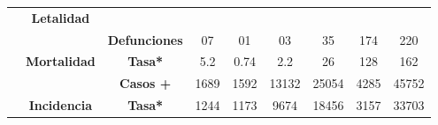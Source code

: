 \begin{tabular}{ccc|cccccc|}
		&\multicolumn{1}{c|}{\multirow{-2}{*}{\cellcolor[HTML]{E2EFDA}\textbf{Letalidad}}}&\cellcolor[HTML]{E2EFDA} 
		&\multicolumn{1}{c|}{\cellcolor[HTML]{E2EFDA}} 
		&\multicolumn{1}{c|}{\cellcolor[HTML]{E2EFDA}} 
		&\multicolumn{1}{c|}{\cellcolor[HTML]{E2EFDA}} 
		&\multicolumn{1}{c|}{\cellcolor[HTML]{E2EFDA}} 
		&\multicolumn{1}{c|}{\cellcolor[HTML]{E2EFDA}} 
		&\cellcolor[HTML]{E2EFDA} \\ \cline{2-2}
		\rowcolor[HTML]{E2EFDA} 
		\multicolumn{1}{|c|}{\cellcolor[HTML]{E2EFDA}} 
		&\multicolumn{1}{c|}{\cellcolor[HTML]{E2EFDA}} 
		&\multirow{-2}{*}{\cellcolor[HTML]{E2EFDA}\textbf{Defunciones}} 
		&\multicolumn{1}{c|}{\multirow{-2}{*}{\cellcolor[HTML]{E2EFDA}07}} 
		&\multicolumn{1}{c|}{\multirow{-2}{*}{\cellcolor[HTML]{E2EFDA}01}} 
		&\multicolumn{1}{c|}{\multirow{-2}{*}{\cellcolor[HTML]{E2EFDA}03}} 
		&\multicolumn{1}{c|}{\multirow{-2}{*}{\cellcolor[HTML]{E2EFDA}35}} 
		&\multicolumn{1}{c|}{\multirow{-2}{*}{\cellcolor[HTML]{E2EFDA}174}} 
		&\multirow{-2}{*}{\cellcolor[HTML]{E2EFDA}220} \\ \cline{3-9} 
		\rowcolor[HTML]{E2EFDA} 
		\multicolumn{1}{|c|}{\cellcolor[HTML]{E2EFDA}} &
		\multicolumn{1}{c|}{\multirow{-2}{*}{\cellcolor[HTML]{E2EFDA}\textbf{Mortalidad}}}&\textbf{Tasa*} 
		&\multicolumn{1}{c|}{\cellcolor[HTML]{E2EFDA}5.2} 
		&\multicolumn{1}{c|}{\cellcolor[HTML]{E2EFDA}0.74} 
		&\multicolumn{1}{c|}{\cellcolor[HTML]{E2EFDA}2.2} 
		&\multicolumn{1}{c|}{\cellcolor[HTML]{E2EFDA}26} 
		&\multicolumn{1}{c|}{\cellcolor[HTML]{E2EFDA}128} 
		&162 \\ \cline{2-9} 
		\rowcolor[HTML]{E2EFDA} 
		\multicolumn{1}{|c|}{\cellcolor[HTML]{E2EFDA}} &
		\multicolumn{1}{c|}{\cellcolor[HTML]{E2EFDA}} &
		\textbf{Casos +} &
		\multicolumn{1}{c|}{\cellcolor[HTML]{E2EFDA}1689} &
		\multicolumn{1}{c|}{\cellcolor[HTML]{E2EFDA}1592} &
		\multicolumn{1}{c|}{\cellcolor[HTML]{E2EFDA}13132} &
		\multicolumn{1}{c|}{\cellcolor[HTML]{E2EFDA}25054} &
		\multicolumn{1}{c|}{\cellcolor[HTML]{E2EFDA}4285} &
		45752 \\ \cline{3-9} 
		\rowcolor[HTML]{E2EFDA} 
		\multicolumn{1}{|c|}{\multirow{-6}{*}{\cellcolor[HTML]{E2EFDA}\textbf{2022}}} &
		\multicolumn{1}{c|}{\multirow{-2}{*}{\cellcolor[HTML]{E2EFDA}\textbf{Incidencia}}} &
		\textbf{Tasa*} &
		\multicolumn{1}{c|}{\cellcolor[HTML]{E2EFDA}1244} &
		\multicolumn{1}{c|}{\cellcolor[HTML]{E2EFDA}1173} &
		\multicolumn{1}{c|}{\cellcolor[HTML]{E2EFDA}9674} &
		\multicolumn{1}{c|}{\cellcolor[HTML]{E2EFDA}18456} &
		\multicolumn{1}{c|}{\cellcolor[HTML]{E2EFDA}3157} &
		33703 \\ \hline
	\end{tabular}
